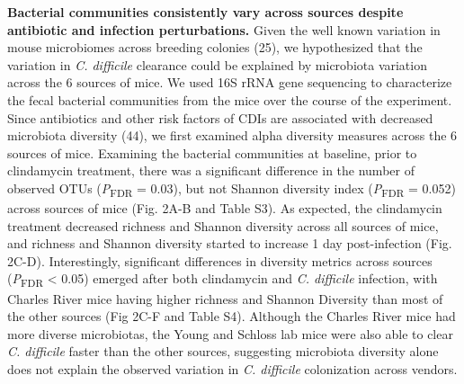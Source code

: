 \documentclass[11pt,]{article}
\begin{document}
\textbf{Bacterial communities consistently vary across sources despite
antibiotic and infection perturbations.} Given the well known variation
in mouse microbiomes across breeding colonies (25), we hypothesized that
the variation in \emph{C. difficile} clearance could be explained by
microbiota variation across the 6 sources of mice. We used 16S rRNA gene
sequencing to characterize the fecal bacterial communities from the mice
over the course of the experiment. Since antibiotics and other risk
factors of CDIs are associated with decreased microbiota diversity (44),
we first examined alpha diversity measures across the 6 sources of mice.
Examining the bacterial communities at baseline, prior to clindamycin
treatment, there was a significant difference in the number of observed
OTUs (\emph{P}\textsubscript{FDR} = 0.03), but not Shannon diversity
index (\emph{P}\textsubscript{FDR} = 0.052) across sources of mice (Fig.
2A-B and Table S3). As expected, the clindamycin treatment decreased
richness and Shannon diversity across all sources of mice, and richness
and Shannon diversity started to increase 1 day post-infection (Fig.
2C-D). Interestingly, significant differences in diversity metrics
across sources (\emph{P}\textsubscript{FDR} \textless{} 0.05) emerged
after both clindamycin and \emph{C. difficile} infection, with Charles
River mice having higher richness and Shannon Diversity than most of the
other sources (Fig 2C-F and Table S4). Although the Charles River mice
had more diverse microbiotas, the Young and Schloss lab mice were also
able to clear \emph{C. difficile} faster than the other sources,
suggesting microbiota diversity alone does not explain the observed
variation in \emph{C. difficile} colonization across vendors.
\end{document}

